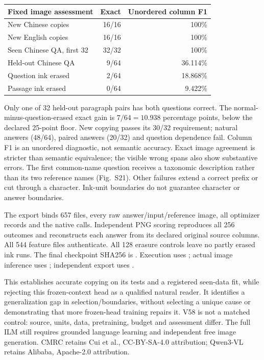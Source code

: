 \documentclass[10pt,a4paper]{article}
\begin{document}
\begin{center}\small
\begin{tabular}{lrr}
\toprule
Fixed image assessment & Exact & Unordered column F1\\
\midrule
New Chinese copies & 16/16 & 100\%\\
New English copies & 16/16 & 100\%\\
Seen Chinese QA, first 32 & 32/32 & 100\%\\
Held-out Chinese QA & 9/64 & 36.114\%\\
Question ink erased & 2/64 & 18.868\%\\
Passage ink erased & 0/64 & 9.422\%\\
\bottomrule
\end{tabular}
\end{center}
Only one of 32 held-out paragraph pairs has both questions correct. The
normal-minus-question-erased exact gain is $7/64=10.938$ percentage points,
below the declared 25-point floor. New copying passes its 30/32 requirement;
natural answers (48/64), paired answers (20/32) and question dependence fail.
Column F1 is an unordered diagnostic, not semantic accuracy. Exact image
agreement is stricter than semantic equivalence; the visible wrong spans
also show substantive errors. The first common-name question receives a
taxonomic description rather than its two reference names (Fig.~S21).
Other failures extend a correct prefix or cut through a character. Ink-unit
boundaries do not guarantee character or answer boundaries.

The export  binds
657 files, every raw answer/input/reference image, all optimizer records and
the native calls. Independent PNG scoring reproduces all 256 outcomes and
reconstructs each answer from its declared original source columns. All 544
feature files authenticate. All 128 erasure controls leave no partly erased
ink runs. The final checkpoint SHA256 is
.
Execution uses ; actual image
inference uses ; independent
export uses .

This establishes accurate copying on its tests and a registered seen-data
fit, while rejecting this frozen-context head as a qualified natural reader.
It identifies a generalization gap in selection/boundaries, without selecting
a unique cause or demonstrating that more frozen-head training repairs it.
V58 is not a matched control: source, units, data, pretraining, budget and
assessment differ. The full ILM still requires grounded language learning
and independent free image generation. CMRC retains Cui et al.\cite{cmrc},
CC-BY-SA-4.0 attribution; Qwen3-VL retains Alibaba, Apache-2.0 attribution.
\end{document}
